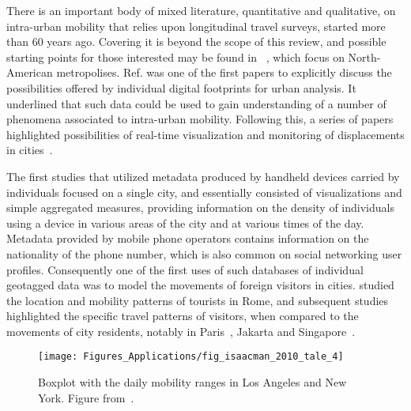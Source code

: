 There is an important body of mixed
literature, quantitative and qualitative, on intra-urban mobility
that relies upon longitudinal travel surveys, started more
than 60 years ago. Covering it is beyond the scope of this review, and
possible starting points for those interested may be found in
~\cite{chapin_1974_human, hanson_2004_geography, golledge_1997_spatial}, which
focus on North-American metropolises. Ref. \cite{ratti_2006_mobile} was one of the first papers to explicitly discuss
the possibilities offered by individual digital footprints for urban
analysis. It underlined that such data could be used to gain
understanding of a number of phenomena associated to intra-urban
mobility. Following this, a series of papers highlighted possibilities of real-time visualization and
monitoring of displacements in cities~\cite{calabrese_2006_real,
reades_2007_cellular, calabrese_2011_estimating}. 


The first studies that utilized metadata produced by handheld devices
carried by individuals focused on a single city, and essentially consisted of
visualizations and simple aggregated measures, providing information on the
density of individuals using a device in various areas of the city and at
various times of the day.  Metadata provided by mobile phone operators contains information on the nationality of the
phone number, which is also common on social networking
user profiles. Consequently one of the first uses of such databases of individual
geotagged data was to model the movements of foreign visitors in
cities. \cite{girardin_2008_digital} studied the location and mobility
patterns of tourists in Rome, and subsequent studies highlighted the
specific travel patterns of visitors, when compared to the movements
of city residents, notably in
Paris~\cite{olteanu_2012_le,fen-chong_2012_organisation}, Jakarta and
Singapore~\cite{chong_2015_not}.

\begin{figure}[t!]
\centering
\texttt{[image: Figures\_Applications/fig\_isaacman\_2010\_tale\_4]}
\caption{Boxplot with the daily mobility ranges in Los Angeles and New York. Figure from~\cite{isaacman_2010_tale}. }
\label{fig:isaacman_2010_tale_4}
\end{figure}

